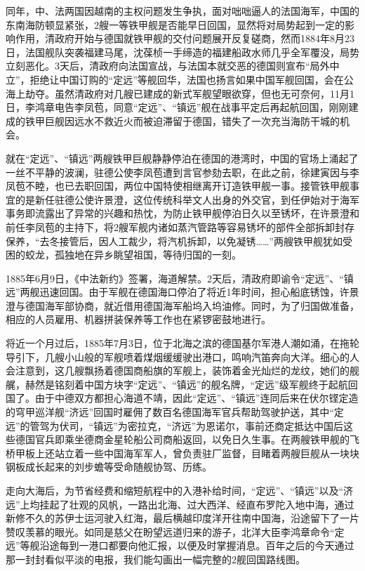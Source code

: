 \documentclass[12pt,UTF8]{ctexbook}
\begin{document}
同年，中、法两国因越南的主权问题发生争执，面对咄咄逼人的法国海军，中国的东南海防顿显紧张，2艘一等铁甲舰是否能早日回国，显然将对局势起到一定的影响作用，清政府开始与德国就铁甲舰的交付问题展开反复磋商，然而1884年8月23日，法国舰队突袭福建马尾，沈葆桢一手缔造的福建船政水师几乎全军覆没，局势立刻恶化。3天后，清政府向法国宣战，与法国本就交恶的德国则宣布“局外中立”，拒绝让中国订购的“定远”等舰回华，法国也扬言如果中国军舰回国，会在公海上劫夺。虽然清政府对几艘已建成的新式军舰望眼欲穿，但也无可奈何，11月1日，李鸿章电告李凤苞，同意“定远”、“镇远”舰在战事平定后再起航回国，刚刚建成的铁甲巨舰因远水不救近火而被迫滞留于德国，错失了一次充当海防干城的机会。

就在“定远”、“镇远”两艘铁甲巨舰静静停泊在德国的港湾时，中国的官场上涌起了一丝不平静的波澜，驻德公使李凤苞遭到言官参劾去职，在此之前，徐建寅因与李凤苞不睦，也已去职回国，两位中国特使相继离开订造铁甲舰一事。接管铁甲舰事宜的是新任驻德公使许景澄，这位传统科举文人出身的外交官，到任伊始对于海军事务即流露出了异常的兴趣和热忱，为防止铁甲舰停泊日久以至锈坏，在许景澄和前任李凤苞的主持下，将2艘军舰内诸如蒸汽管路等容易锈坏的部件全部拆卸封存保养，“去冬接管后，因人工裁少，将汽机拆卸，以免凝锈……”两艘铁甲舰犹如受困的蛟龙，孤独地在异乡眺望祖国，等待归国的一刻。

1885年6月9日，《中法新约》签署，海道解禁。2天后，清政府即谕令“定远”、“镇远”两舰迅速回国。由于军舰在德国海口停泊了将近1年时间，担心船底锈蚀，许景澄与德国海军部协商，就近借用德国海军船坞入坞油修。同时，为了归国做准备，相应的人员雇用、机器拼装保养等工作也在紧锣密鼓地进行。

将近一个月过后，1885年7月3日，位于北海之滨的德国基尔军港人潮如涌，在拖轮导引下，几艘小山般的军舰喷着煤烟缓缓驶出港口，鸣响汽笛奔向大洋。细心的人会注意到，这几艘飘扬着德国商船旗的军舰上，装饰着金光灿烂的龙纹，她们的舰艉，赫然是铭刻着中国方块字“定远”、“镇远”的舰名牌，“定远”级军舰终于起航回国了。由于中德双方都担心海道不靖，因此“定远”、“镇远”连同后来在伏尔铿定造的穹甲巡洋舰“济远”回国时雇佣了数百名德国海军官兵帮助驾驶护送，其中“定远”的管驾为伏司，“镇远”为密拉克，“济远”为恩诺尔，事前还商定抵达中国后这些德国官兵即乘坐德商金星轮船公司商船返回，以免日久生事。在两艘铁甲舰的飞桥甲板上还站立着一些中国海军军人，曾负责驻厂监督，目睹着两艘巨舰从一块块钢板成长起来的刘步蟾等受命随舰协驾、历练。

走向大海后，为节省经费和缩短航程中的入港补给时间，“定远”、“镇远”以及“济远”上均挂起了壮观的风帆，一路出北海、过大西洋、经直布罗陀入地中海，通过新修不久的苏伊士运河驶入红海，最后横越印度洋开往南中国海，沿途留下了一片赞叹羡慕的眼光。如同是慈父在盼望远道归来的游子，北洋大臣李鸿章命令“定远”等舰沿途每到一港口都要向他汇报，以便及时掌握消息。百年之后的今天通过那一封封看似平淡的电报，我们能勾画出一幅完整的2舰回国路线图。
\end{document}
